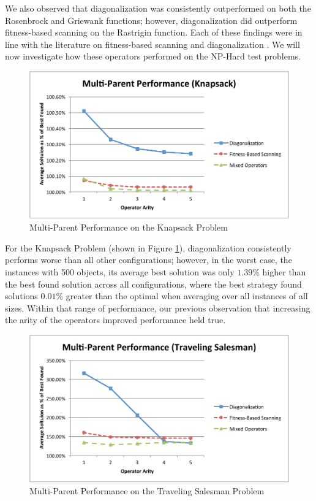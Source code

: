 We also observed that diagonalization was consistently outperformed on both the Rosenbrock and Griewank functions; however, diagonalization did outperform fitness-based scanning on the Rastrigin function. Each of these findings were in line with the literature on fitness-based scanning and diagonalization \cite{Eiben94, Eiben95}. We will now investigate how these operators performed on the NP-Hard test problems.

\begin{figure}[htbp!]
\centering
\includegraphics[scale=0.70]{charts/MP_Knapsack.pdf}
\caption{Multi-Parent Performance on the Knapsack Problem}
\label{fig:mp_knapsack}
\end{figure}

For the Knapsack Problem (shown in Figure \ref{fig:mp_knapsack}), diagonalization consistently performs worse than all other configurations; however, in the worst case, the instances with 500 objects, its average best solution was only $1.39\%$ higher than the best found solution across all configurations, where the best strategy found solutions $0.01\%$ greater than the optimal when averaging over all instances of all sizes. Within that range of performance, our previous observation that increasing the arity of the operators improved performance held true.

\begin{figure}[htbp!]
\centering
\includegraphics[scale=0.70]{charts/MP_TSP.pdf}
\caption{Multi-Parent Performance on the Traveling Salesman Problem}
\label{fig:mp_tsp}
\end{figure}


